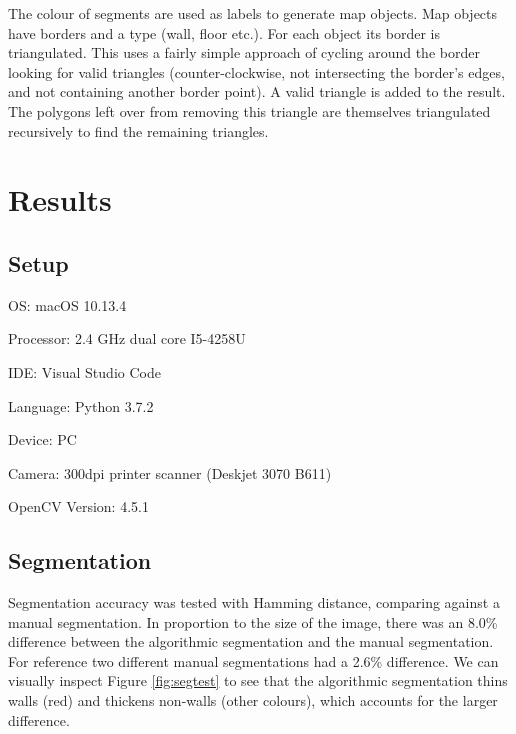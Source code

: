 \documentclass[conference]{IEEEtran}
\begin{document}
The colour of segments are used as labels to generate map objects. Map objects have borders and a type (wall, floor etc.). For each object its border is triangulated. This uses a fairly simple approach of cycling around the border looking for valid triangles (counter-clockwise, not intersecting the border's edges, and not containing another border point). A valid triangle is added to the result. The polygons left over from removing this triangle are themselves triangulated recursively to find the remaining triangles. 


\section{Results}

\subsection{Setup}
OS: macOS 10.13.4

Processor: 2.4 GHz dual core I5-4258U

IDE: Visual Studio Code

Language: Python 3.7.2

Device: PC

Camera: 300dpi printer scanner (Deskjet 3070 B611)

OpenCV Version: 4.5.1

\subsection{Segmentation}

Segmentation accuracy was tested with Hamming distance, comparing against a manual segmentation. In proportion to the size of the image, there was an 8.0\% difference between the algorithmic segmentation and the manual segmentation. For reference two different manual segmentations had a 2.6\% difference. We can visually inspect Figure \ref{fig:segtest} to see that the algorithmic segmentation thins walls (red) and thickens non-walls (other colours), which accounts for the larger difference.
\end{document}
